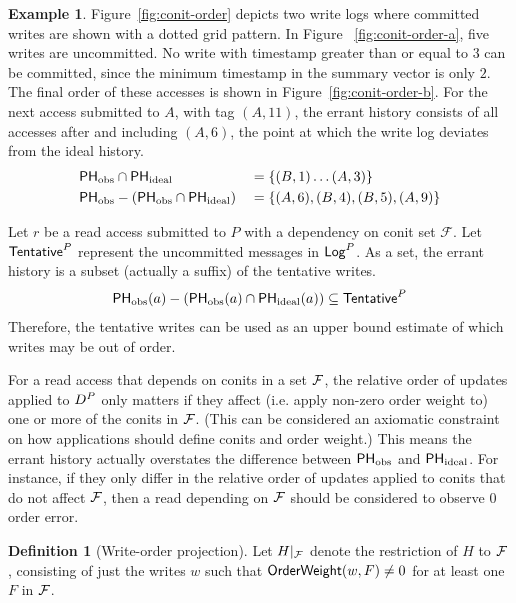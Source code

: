\documentclass[]             %
{NASA}                       %
\theoremstyle{definition}
\newtheorem{example}[theorem]{Example}
\newtheorem{definition}[theorem]{Definition}
\begin{document}
\begin{example}
  \label{ex:conit-order}
  Figure~\ref{fig:conit-order} depicts two write logs where committed
  writes are shown with a dotted grid pattern. In Figure
 ~\ref{fig:conit-order-a}, five writes are uncommitted. No write with
  timestamp greater than or equal to $3$ can be committed, since the
  minimum timestamp in the summary vector is only $2$. The final order
  of these accesses is shown in Figure~\ref{fig:conit-order-b}. For
  the next access submitted to $A$, with tag $(A, 11)$, the errant history
  consists of all accesses after and including $(A, 6)$, the point at
  which the write log deviates from the ideal history.
  \begin{align*}
    &\mathsf{PH}_{\mathrm{obs}} \cap \mathsf{PH}_{\mathrm{ideal}} &&= \{ (B, 1) \ldots (A, 3) \} \\
    &\mathsf{PH}_{\mathrm{obs}} - \left(\mathsf{PH}_{\mathrm{obs}} \cap \mathsf{PH}_{\mathrm{ideal}}\right) &&= \{ (A, 6), (B, 4), (B, 5), (A, 9) \}
  \end{align*}
\end{example}

Let $r$ be a read access submitted to $P$ with a dependency on conit
set $\mathcal{F}$.  Let $\mathsf{Tentative}^{P}$ represent the uncommitted
messages in $\mathsf{Log}^{P}$. As a set, the errant history is a subset
(actually a suffix) of the tentative writes.
\begin{equation}
  \mathsf{PH}_{\mathrm{obs}}(a) - \left(\mathsf{PH}_{\mathrm{obs}}(a) \cap \mathsf{PH}_{\mathrm{ideal}}(a)\right) \subseteq \mathsf{Tentative}^{P}
\end{equation}
Therefore, the tentative writes can be used as an upper bound estimate
of which writes may be out of order.

For a read access that depends on conits in a set $\mathcal{F}$, the
relative order of updates applied to $D^{P}$ only matters if they
affect (i.e. apply non-zero order weight to) one or more of the conits
in $\mathcal{F}$. (This can be considered an axiomatic constraint on how
applications should define conits and order weight.) This means the
errant history actually overstates the difference between $\mathsf{PH}_{\mathrm{obs}}$ and
$\mathsf{PH}_{\mathrm{ideal}}$. For instance, if they only differ in the relative order of
updates applied to conits that do not affect $\mathcal{F}$, then a read
depending on $\mathcal{F}$ should be considered to observe $0$ order
error.

\begin{definition}[Write-order projection]
  Let $H|_{\mathcal{F}}$ denote the restriction of $H$ to $\mathcal{F}$,
  consisting of just the writes $w$ such that
  $\mathsf{OrderWeight}(w, F) \neq 0$ for at least one $F$ in $\mathcal{F}$.
\end{definition}
\end{document}
